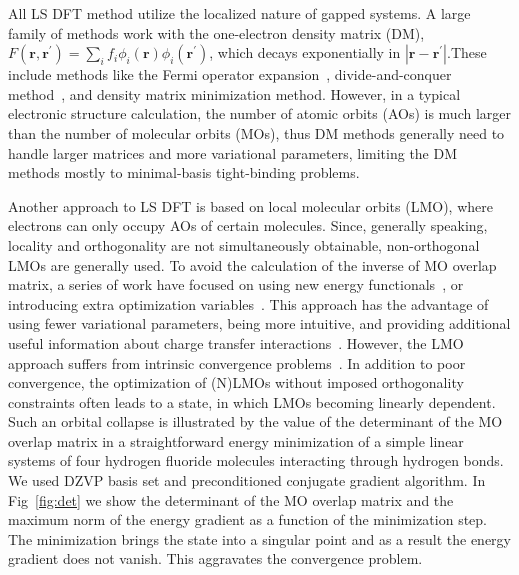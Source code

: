 \documentclass[aps,prl,twocolumn,reprint,amsmath,amssymb]{revtex4-1}
\begin{document}
All LS DFT method utilize the localized nature of gapped systems. A large family of methods work with the one-electron density matrix (DM)\cite{li1993density,lee1996linear,li2003density,vandevondele2012linear}, $F(\mathbf{r},\mathbf{r}^{'})=\sum_i f_i \phi_i(\mathbf{r}) \phi_i(\mathbf{r}^{'})$, which decays exponentially in $|\mathbf{r}-\mathbf{r}^{'}|$.These include methods like the Fermi operator expansion~\cite{goedecker1994efficient,goedecker1995tight}, divide-and-conquer method~\cite{yang1991direct,yang1991local}, and density matrix minimization method\cite{li1993density}. However, in a typical electronic structure calculation, the number of atomic orbits (AOs) is much larger than the number of molecular orbits (MOs), thus DM methods generally need to handle larger matrices and more variational parameters, limiting the DM methods mostly to minimal-basis tight-binding problems. 

 
Another approach to LS DFT is based on local molecular orbits (LMO), where electrons can only occupy AOs of certain molecules. Since, generally speaking, locality and orthogonality are not simultaneously obtainable, non-orthogonal LMOs are generally used. 
To avoid the calculation of the inverse of MO overlap matrix, a series of work have focused on using new energy functionals~\cite{mauri1993orbital,kim1995total,ordejon1995linear}, or introducing extra optimization variables~\cite{burger2008linear,peng2013effective}. This approach has the advantage of using fewer variational parameters, being more intuitive, and providing additional useful information about charge transfer interactions~\cite{khaliullin2007unravelling,khaliullin2008analysis}. However, the LMO approach suffers from intrinsic convergence problems~\cite{ordejon1995linear,fattebert2004linear}.
%
%
In addition to poor convergence, the optimization of (N)LMOs without imposed orthogonality constraints often leads to a state, in which LMOs becoming linearly dependent. Such an orbital collapse is illustrated by the value of the determinant of the MO overlap matrix in a straightforward energy minimization of a simple linear systems of four hydrogen fluoride molecules interacting through hydrogen bonds. We used DZVP basis set and preconditioned conjugate gradient algorithm. In Fig~\ref{fig:det} we show the determinant of the MO overlap matrix and the maximum norm of the energy gradient as a function of the minimization step. The minimization brings the state into a singular point and as a result the energy gradient does not vanish. This aggravates the convergence problem.
\end{document}
